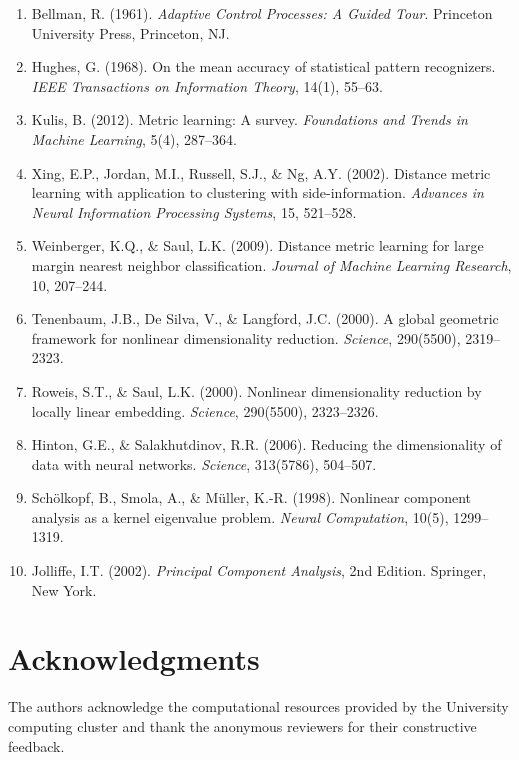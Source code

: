\documentclass[review]{elsarticle}
\begin{document}
\begin{enumerate}

\item Bellman, R. (1961). \emph{Adaptive Control Processes: A Guided Tour}. Princeton University Press, Princeton, NJ.

\item Hughes, G. (1968). On the mean accuracy of statistical pattern recognizers. \emph{IEEE Transactions on Information Theory}, 14(1), 55--63.

\item Kulis, B. (2012). Metric learning: A survey. \emph{Foundations and Trends in Machine Learning}, 5(4), 287--364.

\item Xing, E.P., Jordan, M.I., Russell, S.J., \& Ng, A.Y. (2002). Distance metric learning with application to clustering with side-information. \emph{Advances in Neural Information Processing Systems}, 15, 521--528.

\item Weinberger, K.Q., \& Saul, L.K. (2009). Distance metric learning for large margin nearest neighbor classification. \emph{Journal of Machine Learning Research}, 10, 207--244.

\item Tenenbaum, J.B., De Silva, V., \& Langford, J.C. (2000). A global geometric framework for nonlinear dimensionality reduction. \emph{Science}, 290(5500), 2319--2323.

\item Roweis, S.T., \& Saul, L.K. (2000). Nonlinear dimensionality reduction by locally linear embedding. \emph{Science}, 290(5500), 2323--2326.

\item Hinton, G.E., \& Salakhutdinov, R.R. (2006). Reducing the dimensionality of data with neural networks. \emph{Science}, 313(5786), 504--507.

\item Schölkopf, B., Smola, A., \& Müller, K.-R. (1998). Nonlinear component analysis as a kernel eigenvalue problem. \emph{Neural Computation}, 10(5), 1299--1319.

\item Jolliffe, I.T. (2002). \emph{Principal Component Analysis}, 2nd Edition. Springer, New York.

\end{enumerate}

\section*{Acknowledgments}

The authors acknowledge the computational resources provided by the University computing cluster and thank the anonymous reviewers for their constructive feedback.
\end{document}
